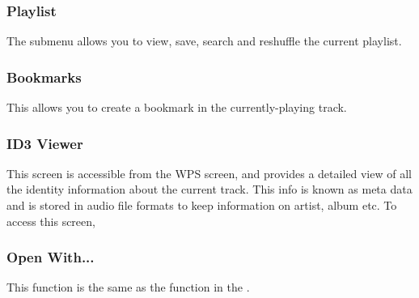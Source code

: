 	\subsubsection{Playlist}
	The  submenu allows you to view, save, search and reshuffle the current 
	playlist.
	
	\subsubsection{Bookmarks}
	This allows you to create a bookmark in the currently-playing track.

	\subsubsection{\label{ref:ID3viewer}ID3 Viewer}
	This screen is accessible from the WPS screen, and provides a detailed view of
	all the identity information about the current track. This info is known as
	meta data and is stored in audio file formats to keep information on artist,
	album etc. To access this screen, %
	
	\subsubsection{Open With...}
	This  function is the same as the  function
	in the \setting{File Context Menu}.
	
